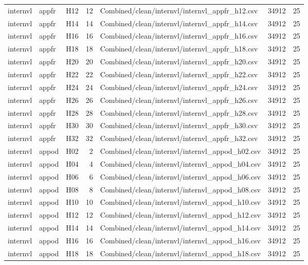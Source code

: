 \begin{longtable}{lllrlrr}
internvl & appfr & H12 & 12 & Combined/clean/internvl/internvl\_appfr\_h12.csv & 34912 & 25 \\
internvl & appfr & H14 & 14 & Combined/clean/internvl/internvl\_appfr\_h14.csv & 34912 & 25 \\
internvl & appfr & H16 & 16 & Combined/clean/internvl/internvl\_appfr\_h16.csv & 34912 & 25 \\
internvl & appfr & H18 & 18 & Combined/clean/internvl/internvl\_appfr\_h18.csv & 34912 & 25 \\
internvl & appfr & H20 & 20 & Combined/clean/internvl/internvl\_appfr\_h20.csv & 34912 & 25 \\
internvl & appfr & H22 & 22 & Combined/clean/internvl/internvl\_appfr\_h22.csv & 34912 & 25 \\
internvl & appfr & H24 & 24 & Combined/clean/internvl/internvl\_appfr\_h24.csv & 34912 & 25 \\
internvl & appfr & H26 & 26 & Combined/clean/internvl/internvl\_appfr\_h26.csv & 34912 & 25 \\
internvl & appfr & H28 & 28 & Combined/clean/internvl/internvl\_appfr\_h28.csv & 34912 & 25 \\
internvl & appfr & H30 & 30 & Combined/clean/internvl/internvl\_appfr\_h30.csv & 34912 & 25 \\
internvl & appfr & H32 & 32 & Combined/clean/internvl/internvl\_appfr\_h32.csv & 34912 & 25 \\
internvl & appod & H02 & 2 & Combined/clean/internvl/internvl\_appod\_h02.csv & 34912 & 25 \\
internvl & appod & H04 & 4 & Combined/clean/internvl/internvl\_appod\_h04.csv & 34912 & 25 \\
internvl & appod & H06 & 6 & Combined/clean/internvl/internvl\_appod\_h06.csv & 34912 & 25 \\
internvl & appod & H08 & 8 & Combined/clean/internvl/internvl\_appod\_h08.csv & 34912 & 25 \\
internvl & appod & H10 & 10 & Combined/clean/internvl/internvl\_appod\_h10.csv & 34912 & 25 \\
internvl & appod & H12 & 12 & Combined/clean/internvl/internvl\_appod\_h12.csv & 34912 & 25 \\
internvl & appod & H14 & 14 & Combined/clean/internvl/internvl\_appod\_h14.csv & 34912 & 25 \\
internvl & appod & H16 & 16 & Combined/clean/internvl/internvl\_appod\_h16.csv & 34912 & 25 \\
internvl & appod & H18 & 18 & Combined/clean/internvl/internvl\_appod\_h18.csv & 34912 & 25 \\

\end{longtable}
